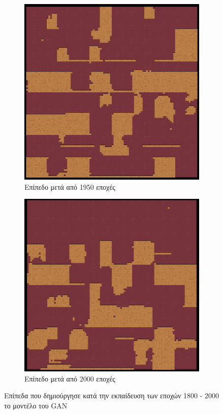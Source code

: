 \begin{figure}[H]
\begin{subfigure}{.5\textwidth}
  \centering
  \includegraphics[width=.8\linewidth]{../images/generated/1950.png}
  \caption{Επίπεδο μετά από 1950 εποχές}
  \label{fig:sfig2}
\end{subfigure}
\begin{subfigure}{.5\textwidth}
  \centering
  \includegraphics[width=.8\linewidth]{../images/generated/2000.png}
  \caption{Επίπεδο μετά από 2000 εποχές}
  \label{fig:sfig2}
\end{subfigure}
\caption{Επίπεδα που δημιούργησε κατά την εκπαίδευση των εποχών 1800 - 2000 το μοντέλο του GAN}
\label{fig:fig}
\end{figure}

